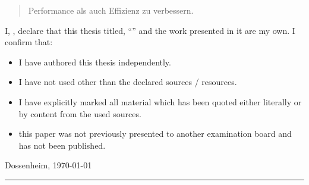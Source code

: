 \documentclass[
11pt, %
oneside, %
english, %
onehalfspacing, %
nolistspacing, %
liststotoc, %
parskip, %
headsepline, %
]{MastersDoctoralThesis} %
\begin{document}
\begin{abstract}
Performance als auch Effizienz zu verbessern.

\end{abstract}


\begin{acknowledgements}

\vspace{.4cm}



\end{acknowledgements}



\renewcommand{\authorshipname}{Statutory declaration}
\begin{declaration}

\noindent I, \authorname, declare that this thesis titled, \enquote{\ttitle} and the work presented in it are my own. I confirm that:

\begin{itemize} 
    \item I	have authored this thesis independently.
    \item I have not used other than the declared sources / resources.
    \item I have explicitly marked all material which has been quoted either literally or by content from the used sources.
    \item this paper was not previously presented to another examination board and has not been published.
\end{itemize}

\vspace{1.2cm}

\noindent Dossenheim, \today\\[.4cm]
\rule[.8cm]{15cm}{.5pt} %
 
\end{declaration}


\end{document}
